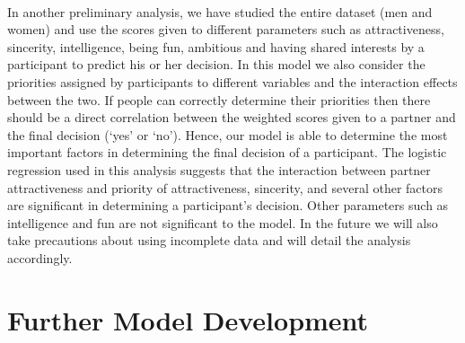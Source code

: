\documentclass{article}
\begin{document}
\null\\
In another preliminary analysis, we have studied the entire dataset (men and women) and use the scores given to different parameters such as attractiveness, sincerity, intelligence, being fun, ambitious and having shared interests by a participant to predict his or her decision. In this model we also consider the priorities assigned by participants to different variables and the interaction effects between the two. If people can correctly determine their priorities then there should be a direct correlation between the weighted scores given to a partner and the final decision (`yes' or `no').  Hence, our model is able to determine the most important factors in determining the final decision of a participant. The logistic regression used in this analysis suggests that the interaction between partner attractiveness and priority of attractiveness, sincerity, and several other factors are significant in determining a participant's decision.  Other parameters such as intelligence and fun are not significant to the model.  In the future we will also take precautions about using incomplete data and will detail the analysis accordingly.
%
\section{Further Model Development}
\end{document}
